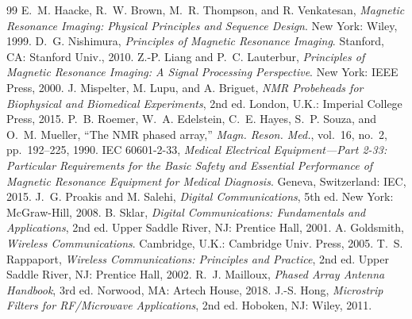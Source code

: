 \begin{thebibliography}{99}
 E.~M. Haacke, R.~W. Brown, M.~R. Thompson, and R. Venkatesan, \emph{Magnetic Resonance Imaging: Physical Principles and Sequence Design}. New York: Wiley, 1999.
 D.~G. Nishimura, \emph{Principles of Magnetic Resonance Imaging}. Stanford, CA: Stanford Univ., 2010.
 Z.-P. Liang and P.~C. Lauterbur, \emph{Principles of Magnetic Resonance Imaging: A Signal Processing Perspective}. New York: IEEE Press, 2000.
 J. Mispelter, M. Lupu, and A. Briguet, \emph{NMR Probeheads for Biophysical and Biomedical Experiments}, 2nd ed. London, U.K.: Imperial College Press, 2015.
 P.~B. Roemer, W.~A. Edelstein, C.~E. Hayes, S.~P. Souza, and O.~M. Mueller, ``The NMR phased array,'' \emph{Magn. Reson. Med.}, vol.~16, no.~2, pp.~192--225, 1990.
 IEC 60601-2-33, \emph{Medical Electrical Equipment---Part 2-33: Particular Requirements for the Basic Safety and Essential Performance of Magnetic Resonance Equipment for Medical Diagnosis}. Geneva, Switzerland: IEC, 2015.
 J.~G. Proakis and M. Salehi, \emph{Digital Communications}, 5th ed. New York: McGraw-Hill, 2008.
 B. Sklar, \emph{Digital Communications: Fundamentals and Applications}, 2nd ed. Upper Saddle River, NJ: Prentice Hall, 2001.
 A. Goldsmith, \emph{Wireless Communications}. Cambridge, U.K.: Cambridge Univ. Press, 2005.
 T.~S. Rappaport, \emph{Wireless Communications: Principles and Practice}, 2nd ed. Upper Saddle River, NJ: Prentice Hall, 2002.
 R.~J. Mailloux, \emph{Phased Array Antenna Handbook}, 3rd ed. Norwood, MA: Artech House, 2018.
 J.-S. Hong, \emph{Microstrip Filters for RF/Microwave Applications}, 2nd ed. Hoboken, NJ: Wiley, 2011.
\end{thebibliography}
